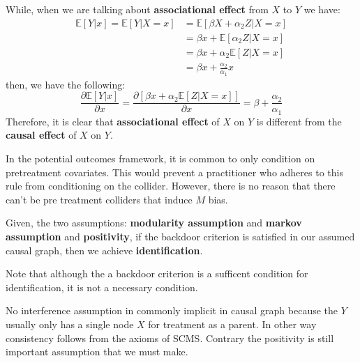 While, when we are talking about \textbf{associational effect} from $X$ to $Y$ we have:
\begin{equation} 
    \begin{array}{ll}
         \mathbb{E}[Y | x] = \mathbb{E}[Y | X = x] & = \mathbb{E}[\beta X + \alpha_2 Z | X = x] \\
         & = \beta x + \mathbb{E}[\alpha_2 Z |X = x]\\
         & = \beta x + \alpha_2 \mathbb{E}[Z |X = x] \\
         & = \beta x + \frac{\alpha_2}{\alpha_1} x
    \end{array}
\end{equation}
then, we have the following:
\begin{equation}
    \frac{\partial \mathbb{E}[Y |x]}{\partial x} = \frac{\partial[\beta x + \alpha_2 \mathbb{E}[Z |X = x]]}{\partial x} = \beta + \frac{\alpha_2}{\alpha_1}
\end{equation}
Therefore, it is clear that \textbf{associational effect} of  $X$ on $Y$ is different from the \textbf{causal effect} of $X$ on $Y$.

In the potential outcomes framework, it is common to only condition on pretreatment 
covariates. This would prevent a practitioner who adheres to this rule from conditioning on the collider. However, there is no reason that there can’t be pre treatment colliders that induce $M$ bias.

Given, the two assumptions: \textbf{modularity assumption} and \textbf{markov assumption}
and \textbf{positivity}, if the backdoor criterion is satisfied in our assumed causal graph, 
then we achieve \textbf{identification}.

\begin{note}
    Note that although the a backdoor criterion is a sufficent condition for identification, it is not a necessary condition.
\end{note}
\begin{note}
    No interference assumption in commonly implicit in causal graph because the $Y$
    usually only has a single node $X$ for treatment as a parent. In other way 
    consistency follows from the axioms of SCMS. Contrary the positivity is still important 
    assumption that we must make.    
\end{note}

